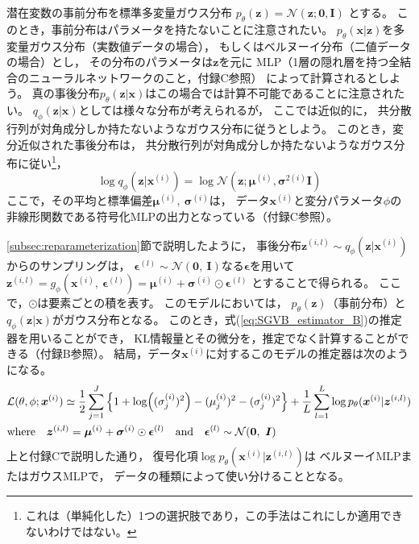 \documentclass[dvipdfmx, fleqn]{jsarticle}
\begin{document}
潜在変数の事前分布を標準多変量ガウス分布
\(p_{\theta} (\bm{z}) = \mathcal{N}(\bm{z}; \bm{0}, \bm{I})\)
とする。
このとき，事前分布はパラメータを持たないことに注意されたい。
\(p_{\theta} (\bm{x} | \bm{z})\)を多変量ガウス分布（実数値データの場合），
もしくはベルヌーイ分布（二値データの場合）とし，
その分布のパラメータは\(\bm{z}\)を元に
MLP（1層の隠れ層を持つ全結合のニューラルネットワークのこと，付録C参照）
によって計算されるとしよう。
真の事後分布\(p_{\theta} (\bm{z} | \bm{x})\)はこの場合では計算不可能であることに注意されたい。
\(q_{\phi} (\bm{z} | \bm{x})\)としては様々な分布が考えられるが，
ここでは近似的に，
共分散行列が対角成分しか持たないようなガウス分布に従うとしよう。
このとき，変分近似された事後分布は，
共分散行列が対角成分しか持たないようなガウス分布に従い\footnote{これは（単純化した）1つの選択肢であり，この手法はこれにしか適用できないわけではない。}，
\begin{equation}
    \log{q_{\phi} (\bm{z} | \bm{x}^{(i)})} = \log{\mathcal{N} (\bm{z}; \bm{\mu}^{(i)}, \bm{\sigma}^{2(i)} \bm{I})}
\end{equation}
ここで，その平均と標準偏差\(\bm{\mu}^{(i)},\ \bm{\sigma}^{(i)}\)は，
データ\(\bm{x}^{(i)}\)と変分パラメータ\(\phi\)の非線形関数である符号化MLPの出力となっている（付録C参照）。

\ref{subsec:reparameterization}節で説明したように，
事後分布\(\bm{z}^{(i, l)} \sim q_{\phi} (\bm{z} | \bm{x}^{(i)}) \)からのサンプリングは，
\(\bm{\epsilon}^{(l)} \sim \mathcal{N}(\bm{0},\ \bm{I})\)なる\(\bm{\epsilon}\)を用いて
\(\bm{z}^{(i, l)} = g_{\phi} (\bm{x}^{(i)},\ \bm{\epsilon}^{(l)}) = \bm{\mu}^{(i)} + \bm{\sigma}^{(i)} \odot \bm{\epsilon}^{(l)}\)
とすることで得られる。
ここで，\(\odot\)は要素ごとの積を表す。
このモデルにおいては，
\(p_{\theta} (\bm{z})\)（事前分布）と\(q_{\phi} (\bm{z} | \bm{x})\)がガウス分布となる。
このとき，式(\ref{eq:SGVB_estimator_B})の推定器を用いることができ，
KL情報量とその微分を，推定でなく計算することができる（付録B参照）。
結局，データ\(\bm{x}^{(i)}\)に対するこのモデルの推定器は次のようになる。
\begin{equation}
    \begin{split}
        & \mathcal{L}(\theta, \phi; \bm{x}^{(i)})
            \simeq \frac{1}{2} \sum_{j=1}^{J} \qty{1 + \log((\sigma_j^{(i)})^2) - (\mu_j^{(i)})^2 - (\sigma_j^{(i)})^2}
                + \frac{1}{L} \sum_{l=1}^{L} \log{p_{\theta} (\bm{x}^{(i)} | \bm{z}^{(i, l)})} \\
        & \text{where} \quad
            \bm{z}^{(i, l)} = \bm{\mu}^{(i)} + \bm{\sigma}^{(i)} \odot \bm{\epsilon}^{(l)}
            \quad \text{and} \quad
            \bm{\epsilon}^{(l)} \sim \mathcal{N}(\bm{0},\ \bm{I})
    \end{split}
    \label{eq:variational_lower_bound_Gauss}
\end{equation}
上と付録Cで説明した通り，
復号化項\(\log{p_{\theta} (\bm{x}^{(i)} | \bm{z}^{(i, l)})}\)は
ベルヌーイMLPまたはガウスMLPで，
データの種類によって使い分けることとなる。
\end{document}
